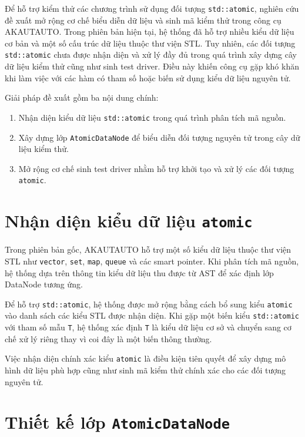 Để hỗ trợ kiểm thử các chương trình sử dụng đối tượng \texttt{std::atomic}, nghiên cứu đề xuất mở rộng cơ chế biểu diễn dữ liệu và sinh mã kiểm thử trong công cụ AKAUTAUTO. Trong phiên bản hiện tại, hệ thống đã hỗ trợ nhiều kiểu dữ liệu cơ bản và một số cấu trúc dữ liệu thuộc thư viện STL. Tuy nhiên, các đối tượng \texttt{std::atomic} chưa được nhận diện và xử lý đầy đủ trong quá trình xây dựng cây dữ liệu kiểm thử cũng như sinh test driver. Điều này khiến công cụ gặp khó khăn khi làm việc với các hàm có tham số hoặc biến sử dụng kiểu dữ liệu nguyên tử.

Giải pháp đề xuất gồm ba nội dung chính:

\begin{enumerate}
    \item Nhận diện kiểu dữ liệu \texttt{std::atomic} trong quá trình phân tích mã nguồn.

    \item Xây dựng lớp \texttt{AtomicDataNode} để biểu diễn đối tượng nguyên tử trong cây dữ liệu kiểm thử.

    \item Mở rộng cơ chế sinh test driver nhằm hỗ trợ khởi tạo và xử lý các đối tượng \texttt{atomic}.
\end{enumerate}


\section{Nhận diện kiểu dữ liệu \texttt{atomic}}

Trong phiên bản gốc, AKAUTAUTO hỗ trợ một số kiểu dữ liệu thuộc thư viện STL như \texttt{vector}, \texttt{set}, \texttt{map}, \texttt{queue} và các smart pointer. Khi phân tích mã nguồn, hệ thống dựa trên thông tin kiểu dữ liệu thu được từ AST để xác định lớp DataNode tương ứng.

Để hỗ trợ \texttt{std::atomic}, hệ thống được mở rộng bằng cách bổ sung kiểu \texttt{atomic} vào danh sách các kiểu STL được nhận diện. Khi gặp một biến kiểu \texttt{std::atomic} với tham số mẫu \texttt{T}, hệ thống xác định \texttt{T} là kiểu dữ liệu cơ sở và chuyển sang cơ chế xử lý riêng thay vì coi đây là một biến thông thường.

Việc nhận diện chính xác kiểu \texttt{atomic} là điều kiện tiên quyết để xây dựng mô hình dữ liệu phù hợp cũng như sinh mã kiểm thử chính xác cho các đối tượng nguyên tử.

\section{Thiết kế lớp \texttt{AtomicDataNode}}

